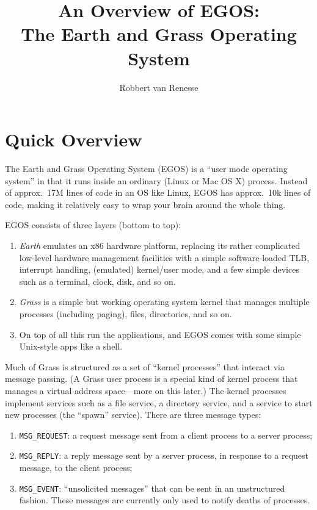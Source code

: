\documentclass{article}
\title{An Overview of EGOS: \\ The Earth and Grass Operating System}
\author{Robbert van Renesse}
\begin{document}
\maketitle

\section{Quick Overview}

The Earth and Grass Operating System (EGOS) is a ``user mode operating system''
in that it runs inside an ordinary (Linux or Mac OS X) process.
Instead of approx.~17M lines of code in an OS like Linux, EGOS has approx.~10k
lines of code, making it relatively easy to wrap your brain around the
whole thing.

EGOS consists of three layers (bottom to top):
\begin{enumerate}
\item \emph{Earth} emulates an x86 hardware platform, replacing its rather
complicated low-level hardware management facilities with a simple
software-loaded TLB, interrupt handling,
(emulated) kernel/user mode, and a few simple devices such as a terminal,
clock, disk, and so on.
\item \emph{Grass} is a simple but working operating system kernel that manages
multiple processes (including paging), files, directories, and so on.
\item On top of all this run the applications, and EGOS comes with some
simple Unix-style apps like a shell.
\end{enumerate}

Much of Grass is structured as a set of ``kernel processes'' that
interact via message passing.  (A Grass user process is a special
kind of kernel process that manages a virtual address space---more on
this later.)
The kernel processes
implement services such as a file service, a directory service,
and a service to start new processes (the ``spawn'' service).
There are three message types:
\begin{enumerate}
\item \texttt{MSG\_REQUEST}: a request message sent from a client process
to a server process;
\item \texttt{MSG\_REPLY}: a reply message sent by a server process,
in response to a request message, to the client process;
\item \texttt{MSG\_EVENT}: ``unsolicited messages'' that can be sent
in an unstructured fashion.  These messages are currently only used to
notify deaths of processes.
\end{enumerate}
\end{document}
